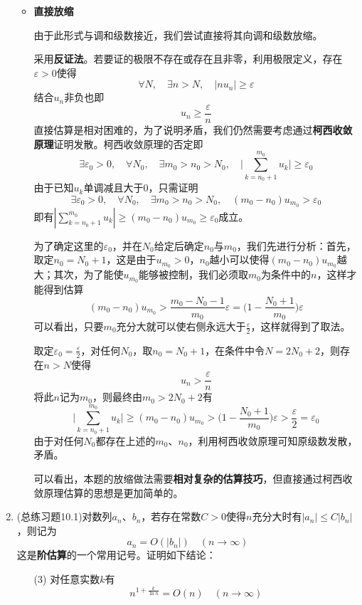 \documentclass[a4paper,UTF8,fontset=windows,AutoFakeBold]{ctexart}
\newcommand*{\note}{\noindent *}
\theoremstyle{ex}
\begin{document}
\begin{enumerate}
{\begin{itemize}
            \item \textbf{直接放缩}
            
            由于此形式与调和级数接近，我们尝试直接将其向调和级数放缩。

            采用\textbf{反证法}。若要证的极限不存在或存在且非零，利用极限定义，存在$\varepsilon>0$使得
            $$\forall N,\quad\exists n>N,\quad |nu_n|\ge\varepsilon$$
            结合$u_n$非负也即
            $$u_n\ge\frac{\varepsilon}{n}$$
            直接估算是相对困难的，为了说明矛盾，我们仍然需要考虑通过\textbf{柯西收敛原理}证明发散。柯西收敛原理的否定即
            $$\exists\varepsilon_0>0,\quad\forall N_0,\quad\exists m_0>n_0>N_0,\quad\bigg|\sum_{k=n_0+1}^{m_0}u_k\bigg|\ge\varepsilon_0$$
            由于已知$u_k$单调减且大于0，只需证明
            $$\exists\varepsilon_0>0,\quad\forall N_0,\quad\exists m_0>n_0>N_0,\quad(m_0-n_0)u_{m_0}>\varepsilon_0$$
            即有$|\sum_{k=n_0+1}^{m_0}u_k|\ge(m_0-n_0)u_{m_0}\ge\varepsilon_0$成立。

            为了确定这里的$\varepsilon_0$，并在$N_0$给定后确定$n_0$与$m_0$，我们先进行分析：首先，取定$n_0=N_0+1$，这是由于$u_{m_0}>0$，$n_0$越小可以使得$(m_0-n_0)u_{m_0}$越大；其次，为了能使$u_{m_0}$能够被控制，我们必须取$m_0$为条件中的$n$，这样才能得到估算
            $$(m_0-n_0)u_{m_0}>\frac{m_0-N_0-1}{m_0}\varepsilon=\bigg(1-\frac{N_0+1}{m_0}\bigg)\varepsilon$$
            可以看出，只要$m_0$充分大就可以使右侧永远大于$\frac{\varepsilon}{2}$，这样就得到了取法。

            取定$\varepsilon_0=\frac{\varepsilon}{2}$，对任何$N_0$，取$n_0=N_0+1$，在条件中令$N=2N_0+2$，则存在$n>N$使得
            $$u_n>\frac{\varepsilon}{n}$$
            将此$n$记为$m_0$，则最终由$m_0>2N_0+2$有
            $$\bigg|\sum_{k=n_0+1}^{m_0}u_k\bigg|\ge(m_0-n_0)u_{m_0}>\bigg(1-\frac{N_0+1}{m_0}\bigg)\varepsilon>\frac{\varepsilon}{2}=\varepsilon_0$$
            由于对任何$N_0$都存在上述的$m_0$、$n_0$，利用柯西收敛原理可知原级数发散，矛盾。

            \note 可以看出，本题的放缩做法需要\textbf{相对复杂的估算技巧}，但直接通过柯西收敛原理估算的思想是更加简单的。
        \end{itemize}
    }

    \item (总练习题10.1)对数列$a_n$、$b_n$，若存在常数$C>0$使得$n$充分大时有$|a_n|\le C|b_n|$，则记为
    $$a_n=O(|b_n|)\quad(n\to\infty)$$
    这是\textbf{阶估算}的一个常用记号。证明如下结论：
    \begin{enumerate}
        \item[(3)] 对任意实数$k$有
        $$n^{1+\frac{k}{\ln n}}=O(n)\quad(n\to\infty)$$


\end{enumerate}
\end{enumerate}
\end{document}
